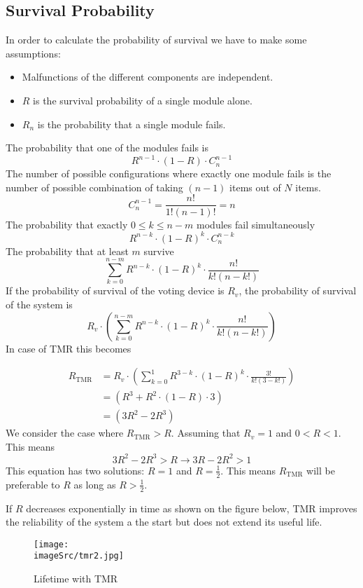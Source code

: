 \documentclass[../main.tex]{subfiles}
\begin{document}
\subsection{Survival Probability}
In order to calculate the probability of survival we have to make some assumptions:
\begin{itemize}
	\item Malfunctions of the different components are independent.
	\item $R$ is the survival probability of a single module alone.
	\item $R_n$ is the probability that a single module fails.
\end{itemize}
The probability that one of the modules fails is
\[
R^{n-1} \cdot (1 - R) \cdot C^{n-1}_{n}
\]
The number of possible configurations where exactly one module fails is the number of possible combination of taking $(n-1)$ items out of $N$ items.
\[
C^{n-1}_{n} = \frac{n!}{1!(n-1)!} = n
\]
The probability that exactly $0 \leq k \leq n-m$ modules fail simultaneously 
\[
R^{n-k} \cdot (1 - R)^k \cdot C^{n-k}_{n}
\]
The probability that at least $m$ survive
\[
\sum^{n-m}_{k=0} R^{n-k} \cdot (1 - R)^k \cdot \frac{n!}{k!(n-k!)}
\]
If the probability of survival of the voting device is $R_v$, the probability of survival of the system is
\[
R_v \cdot \left( \sum^{n-m}_{k=0} R^{n-k} \cdot (1 - R)^k \cdot \frac{n!}{k!(n-k!)} \right)
\]
In case of TMR this becomes

\begin{align*}
R_\text{TMR} & = R_v \cdot \left( \sum^{1}_{k=0} R^{3-k} \cdot (1 - R)^k \cdot \frac{3!}{k!(3-k!)} \right) \\
& = \left( R^3 + R^2 \cdot (1-R) \cdot 3 \right) \\
& = \left( 3R^2 - 2R^3 \right)
\end{align*}
We consider the case where $R_{\text{TMR}} > R$. Assuming that $R_v = 1$ and $0 < R < 1$. This means
\[
3R^2 - 2R^3 > R \rightarrow 3R-2R^2 > 1
\]
This equation has two solutions: $R = 1$ and $R = \frac{1}{2}$. This means $R_{\text{TMR}}$ will be preferable to $R$ as long as $R > \frac{1}{2}$. 

\begin{exmp}
If $R$ decreases exponentially in time as shown on the figure below, TMR improves the reliability of the system a the start but does not extend its useful life.
\begin{figure}[h!]
    \centering
    \texttt{[image: \\imageSrc/tmr2.jpg]}
    \caption{Lifetime with TMR}
    \label{tmr1}
\end{figure}
\end{exmp}
\end{document}
